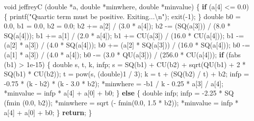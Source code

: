 \documentclass[
  12pt,
]{book}
\newenvironment{Shaded}{\begin{snugshade}}{\end{snugshade}}
\newcommand{\ControlFlowTok}[1]{\textcolor[rgb]{0.13,0.29,0.53}{\textbf{#1}}}
\newcommand{\DataTypeTok}[1]{\textcolor[rgb]{0.13,0.29,0.53}{#1}}
\newcommand{\DecValTok}[1]{\textcolor[rgb]{0.00,0.00,0.81}{#1}}
\newcommand{\FloatTok}[1]{\textcolor[rgb]{0.00,0.00,0.81}{#1}}
\newcommand{\NormalTok}[1]{#1}
\newcommand{\SpecialCharTok}[1]{\textcolor[rgb]{0.00,0.00,0.00}{#1}}
\newcommand{\StringTok}[1]{\textcolor[rgb]{0.31,0.60,0.02}{#1}}
\theoremstyle{definition}
\theoremstyle{definition}
\theoremstyle{definition}
\theoremstyle{definition}
\theoremstyle{remark}
\begin{document}
\begin{Shaded}
\begin{Highlighting}[]
\DataTypeTok{void}\NormalTok{ jeffreyC (}\DataTypeTok{double}\NormalTok{ *a, }\DataTypeTok{double}\NormalTok{ *minwhere, }\DataTypeTok{double}\NormalTok{ *minvalue) \{}
  \ControlFlowTok{if}\NormalTok{ (a[}\DecValTok{4}\NormalTok{] \textless{}= }\FloatTok{0.0}\NormalTok{) \{}
\NormalTok{    printf(}\StringTok{"Quartic term must be positive. Exiting...}\SpecialCharTok{\textbackslash{}n}\StringTok{"}\NormalTok{);}
\NormalTok{    exit({-}}\DecValTok{1}\NormalTok{);}
\NormalTok{  \}}
  \DataTypeTok{double}\NormalTok{ b0 = }\FloatTok{0.0}\NormalTok{, b1 = }\FloatTok{0.0}\NormalTok{, b2 = }\FloatTok{0.0}\NormalTok{;}
\NormalTok{  b2 += a[}\DecValTok{2}\NormalTok{] / (}\FloatTok{3.0}\NormalTok{ * a[}\DecValTok{4}\NormalTok{]);}
\NormalTok{  b2 {-}= (SQ(a[}\DecValTok{3}\NormalTok{])) / (}\FloatTok{8.0}\NormalTok{ * SQ(a[}\DecValTok{4}\NormalTok{]));}
\NormalTok{  b1 += a[}\DecValTok{1}\NormalTok{] / (}\FloatTok{2.0}\NormalTok{ * a[}\DecValTok{4}\NormalTok{]);}
\NormalTok{  b1 += CU(a[}\DecValTok{3}\NormalTok{]) / (}\FloatTok{16.0}\NormalTok{ * CU(a[}\DecValTok{4}\NormalTok{]));}
\NormalTok{  b1 {-}= (a[}\DecValTok{2}\NormalTok{] * a[}\DecValTok{3}\NormalTok{]) / (}\FloatTok{4.0}\NormalTok{ * SQ(a[}\DecValTok{4}\NormalTok{]));}
\NormalTok{  b0 += (a[}\DecValTok{2}\NormalTok{] * SQ(a[}\DecValTok{3}\NormalTok{])) / (}\FloatTok{16.0}\NormalTok{ * SQ(a[}\DecValTok{4}\NormalTok{]));}
\NormalTok{  b0 {-}= (a[}\DecValTok{1}\NormalTok{] * a[}\DecValTok{3}\NormalTok{]) / (}\FloatTok{4.0}\NormalTok{ * a[}\DecValTok{4}\NormalTok{]);}
\NormalTok{  b0 {-}= (}\FloatTok{3.0}\NormalTok{ * QU(a[}\DecValTok{3}\NormalTok{])) / (}\FloatTok{256.0}\NormalTok{ * CU(a[}\DecValTok{4}\NormalTok{]));}
  \ControlFlowTok{if}\NormalTok{ (fabs (b1) \textgreater{}  }\FloatTok{1e{-}15}\NormalTok{) \{}
    \DataTypeTok{double}\NormalTok{ s, t, k, infp;}
\NormalTok{    s = SQ(b1) + CU(b2) + sqrt(QU(b1) + }\DecValTok{2}\NormalTok{ * SQ(b1) * CU(b2));}
\NormalTok{    t = pow(s, (}\DataTypeTok{double}\NormalTok{)}\DecValTok{1}\NormalTok{ / }\DecValTok{3}\NormalTok{);}
\NormalTok{    k = t + (SQ(b2) / t) + b2;}
\NormalTok{    infp = {-}}\FloatTok{0.75}\NormalTok{ * (k {-} b2) * (k {-} }\FloatTok{3.0}\NormalTok{ * b2);}
\NormalTok{    *minwhere = {-}b1 / k {-} }\FloatTok{0.25}\NormalTok{ * a[}\DecValTok{3}\NormalTok{] / a[}\DecValTok{4}\NormalTok{];}
\NormalTok{    *minvalue = infp * a[}\DecValTok{4}\NormalTok{] + a[}\DecValTok{0}\NormalTok{] + b0;}
\NormalTok{  \} }\ControlFlowTok{else}\NormalTok{ \{}
    \DataTypeTok{double}\NormalTok{ infp;}
\NormalTok{    infp = {-}}\FloatTok{2.25}\NormalTok{ * SQ (fmin (}\FloatTok{0.0}\NormalTok{, b2));}
\NormalTok{    *minwhere = sqrt ({-} fmin(}\FloatTok{0.0}\NormalTok{, }\FloatTok{1.5}\NormalTok{ * b2));}
\NormalTok{    *minvalue = infp * a[}\DecValTok{4}\NormalTok{] + a[}\DecValTok{0}\NormalTok{] + b0;}
\NormalTok{  \}}
  \ControlFlowTok{return}\NormalTok{;}
\NormalTok{\}}
\end{Highlighting}
\end{Shaded}
\end{document}
